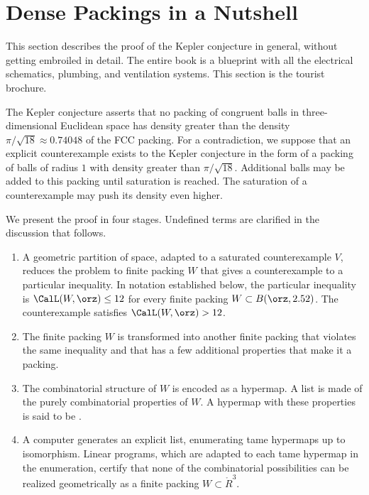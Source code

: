\section{Dense Packings in a Nutshell}

This section describes the proof of the Kepler conjecture in general,
without
getting embroiled in detail.  The entire book
is a blueprint with all the electrical schematics, plumbing, and
ventilation systems.  This section is the tourist brochure.

The Kepler conjecture asserts that no packing of congruent balls in
three-dimensional Euclidean space has density greater than the density
$\pi/\sqrt{18} \approx 0.74048$ of the FCC packing.  For a contradiction, we suppose that an
explicit counterexample exists to the Kepler conjecture in the form of a
packing of balls of radius $1$ with density  greater than
$\pi/\sqrt{18}$.  Additional balls may be added to this packing until
saturation is reached.  The saturation of a counterexample may push its
density even higher.

We present the proof in four stages.  Undefined terms are clarified in the
discussion that follows.

\begin{enumerate}
\item A geometric partition of space, adapted to a saturated
  counterexample $V$, reduces the problem to finite packing $W$ that
  gives a counterexample to a particular inequality.  In notation
  established below, the particular inequality is $\CalL(W,\orz)\le
  12$ for every finite packing $W\subset B(\orz,2.52)$.  The
  counterexample satisfies $\CalL(W,\orz)>12$.
\item The finite packing $W$ is transformed into another finite packing that violates the same
inequality and that has a few additional properties that make it a  packing.
\item The combinatorial structure of $W$ is encoded as a hypermap.  A list is
  made of the purely combinatorial properties of $W$.  A hypermap with
  these properties is said to be .
\item A computer generates an explicit list, enumerating
  tame hypermaps up to isomorphism.  Linear programs, which are
  adapted to each tame hypermap in the enumeration, certify that
  none of the combinatorial possibilities can be  realized geometrically as a finite packing
  $W\subset \ring{R}^3$.  
\end{enumerate}

